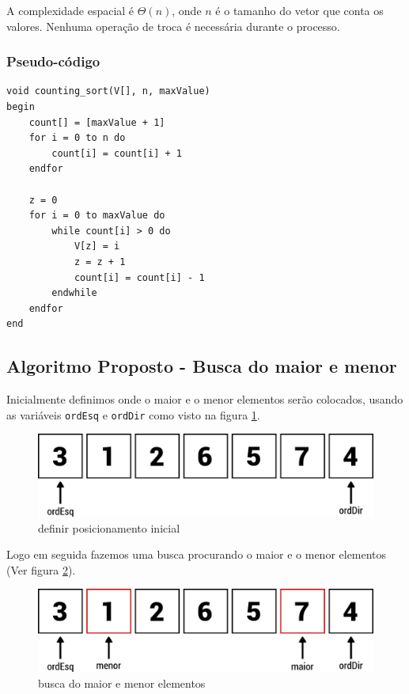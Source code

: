 A complexidade espacial é $\Theta(n)$, onde $n$ é o tamanho do vetor que
conta os valores. Nenhuma operação de troca é necessária durante o
processo.

\subsubsection{Pseudo-código}

\begin{verbatim}
void counting_sort(V[], n, maxValue)
begin
    count[] = [maxValue + 1]
    for i = 0 to n do
        count[i] = count[i] + 1
    endfor

    z = 0
    for i = 0 to maxValue do
        while count[i] > 0 do
            V[z] = i
            z = z + 1
            count[i] = count[i] - 1
        endwhile
    endfor
end
\end{verbatim}
\subsection{Algoritmo Proposto - Busca do maior e menor}

Inicialmente definimos onde o maior e o menor elementos serão colocados,
usando as variáveis \texttt{ordEsq} e \texttt{ordDir} como visto na
figura \ref{fig:passo1}.

\begin{figure}[h]
   \includegraphics[scale=0.6]{img/maior.menor.algoritmo/passo1.png}
   \caption{definir posicionamento inicial}
   \label{fig:passo1}
\end{figure}

Logo em seguida fazemos uma busca procurando o maior e o menor elementos
(Ver figura \ref{fig:passo2}).

\begin{figure}[h]
   \includegraphics[scale=0.6]{img/maior.menor.algoritmo/passo2.png}
   \caption{busca do maior e menor elementos}
   \label{fig:passo2}
\end{figure}


